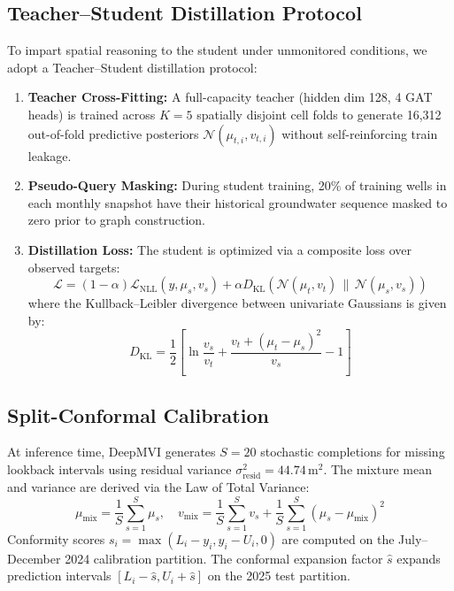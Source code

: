 \documentclass[10pt,journal,compsoc]{IEEEtran}
\begin{document}
\subsection{Teacher--Student Distillation Protocol}
To impart spatial reasoning to the student under unmonitored conditions, we adopt a Teacher--Student distillation protocol:
\begin{enumerate}
    \item \textbf{Teacher Cross-Fitting:} A full-capacity teacher (hidden dim 128, 4 GAT heads) is trained across $K=5$ spatially disjoint cell folds to generate 16,312 out-of-fold predictive posteriors $\mathcal{N}(\mu_{t,i}, v_{t,i})$ without self-reinforcing train leakage.
    \item \textbf{Pseudo-Query Masking:} During student training, 20\% of training wells in each monthly snapshot have their historical groundwater sequence masked to zero prior to graph construction.
    \item \textbf{Distillation Loss:} The student is optimized via a composite loss over observed targets:
    \begin{equation}
    \mathcal{L} = (1 - \alpha)\mathcal{L}_{\text{NLL}}(y, \mu_s, v_s) + \alpha D_{\text{KL}}\left(\mathcal{N}(\mu_t, v_t) \,\parallel\, \mathcal{N}(\mu_s, v_s)\right)
    \end{equation}
    where the Kullback--Leibler divergence between univariate Gaussians is given by:
    \begin{equation}
    D_{\text{KL}} = \frac{1}{2}\left[\ln\frac{v_s}{v_t} + \frac{v_t + (\mu_t - \mu_s)^2}{v_s} - 1\right]
    \end{equation}
\end{enumerate}

\subsection{Split-Conformal Calibration}
At inference time, DeepMVI generates $S=20$ stochastic completions for missing lookback intervals using residual variance $\sigma^2_{\text{resid}} = 44.74$\,m$^2$. The mixture mean and variance are derived via the Law of Total Variance:
\begin{equation}
\mu_{\text{mix}} = \frac{1}{S}\sum_{s=1}^S \mu_s, \quad v_{\text{mix}} = \frac{1}{S}\sum_{s=1}^S v_s + \frac{1}{S}\sum_{s=1}^S (\mu_s - \mu_{\text{mix}})^2
\end{equation}
Conformity scores $s_i = \max(L_i - y_i, y_i - U_i, 0)$ are computed on the July--December 2024 calibration partition. The conformal expansion factor $\hat{s}$ expands prediction intervals $[L_i - \hat{s}, U_i + \hat{s}]$ on the 2025 test partition.
\end{document}
